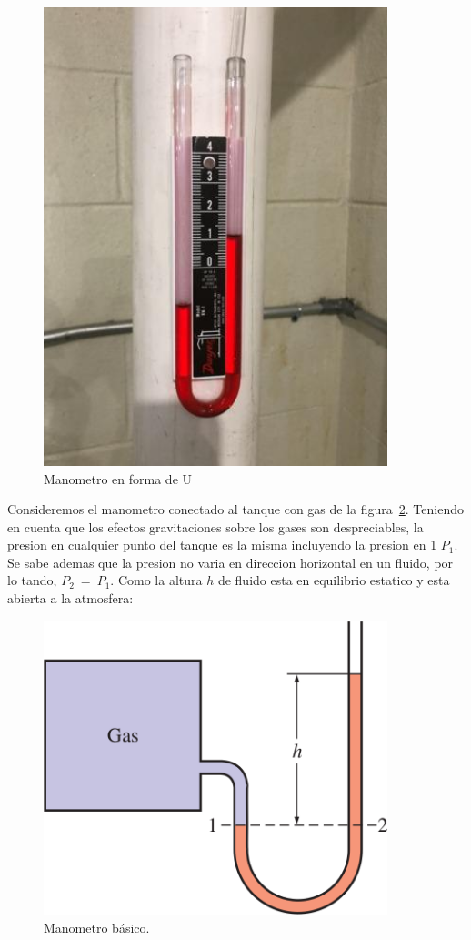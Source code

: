 \documentclass[10pt, oneside]{article}
\begin{document}
\begin{figure}[h]
\centering
\includegraphics[width=10cm]{mano1}
\caption{Manometro en forma de U}
\label{mano1}
\end{figure}

Consideremos el manometro conectado al tanque con gas de la figura~\ref{mano2}. Teniendo en cuenta que los efectos gravitaciones sobre los gases son despreciables, la presion en cualquier punto del tanque es la misma incluyendo la presion en 1 $P_1$. Se sabe ademas que la presion no varia en direccion horizontal en un fluido, por lo tando, $P_2\ =\ P_1$. Como la altura $h$ de fluido esta en equilibrio estatico y esta abierta a la atmosfera:

\begin{figure}[h]
\centering
\includegraphics[width=10cm]{mano2}
\caption{Manometro b\'asico.}
\label{mano2}
\end{figure}
\end{document}
